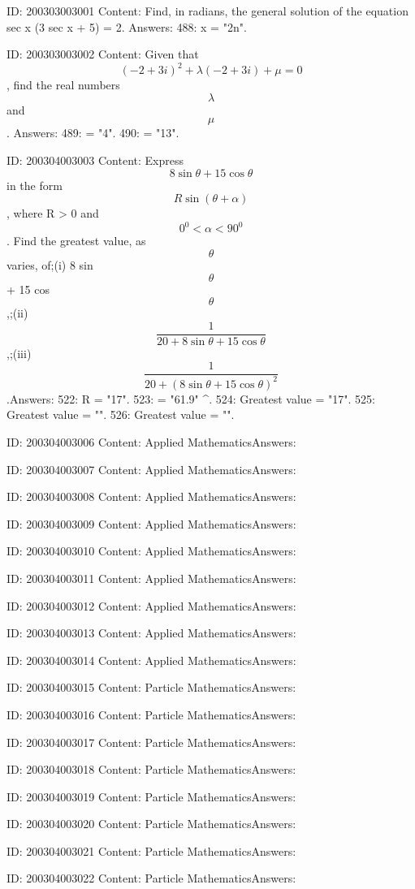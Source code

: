 \documentclass{article}
\begin{document}
ID: 200303003001
Content:
Find, in radians, the general solution of the equation sec x (3 sec x + 5) = 2. Answers:
488: x = "2n\pi\pm{}\pi".

ID: 200303003002
Content:
Given that  $$(  - 2 + 3i )^2  + \lambda (  - 2 + 3i ) + \mu  = 0$$, find the real numbers  $$\lambda $$ and  $$\mu $$. Answers:
489: \lambda = "4".
490: \mu = "13".

ID: 200304003003
Content:
Express  $$8\sin \theta  + 15\cos \theta $$ in the form  $$R\sin ( \theta  + \alpha  )$$, where R > 0 and  $$0^0  < \alpha  < 90^0 $$. Find the greatest value, as  $$\theta $$ varies, of;(i) 8 sin  $$\theta $$ + 15 cos  $$\theta $$,;(ii) $$\frac{1}{20 + 8\sin \theta  + 15\cos \theta}$$,;(iii) $$\frac{1}{20 + (8\sin \theta  + 15\cos \theta)^2}$$.Answers:
522: R = "17".
523: \alpha = "61.9" ^{\circ}.
524: Greatest value = "17".
525: Greatest value = "".
526: Greatest value = "".

ID: 200304003006
Content:
Applied MathematicsAnswers:

ID: 200304003007
Content:
Applied MathematicsAnswers:

ID: 200304003008
Content:
Applied MathematicsAnswers:

ID: 200304003009
Content:
Applied MathematicsAnswers:

ID: 200304003010
Content:
Applied MathematicsAnswers:

ID: 200304003011
Content:
Applied MathematicsAnswers:

ID: 200304003012
Content:
Applied MathematicsAnswers:

ID: 200304003013
Content:
Applied MathematicsAnswers:

ID: 200304003014
Content:
Applied MathematicsAnswers:

ID: 200304003015
Content:
Particle MathematicsAnswers:

ID: 200304003016
Content:
Particle MathematicsAnswers:

ID: 200304003017
Content:
Particle MathematicsAnswers:

ID: 200304003018
Content:
Particle MathematicsAnswers:

ID: 200304003019
Content:
Particle MathematicsAnswers:

ID: 200304003020
Content:
Particle MathematicsAnswers:

ID: 200304003021
Content:
Particle MathematicsAnswers:

ID: 200304003022
Content:
Particle MathematicsAnswers:
\end{document}

